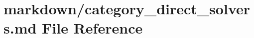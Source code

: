 \hypertarget{category__direct__solvers_8md}{}\section{markdown/category\+\_\+direct\+\_\+solvers.md File Reference}
\label{category__direct__solvers_8md}
